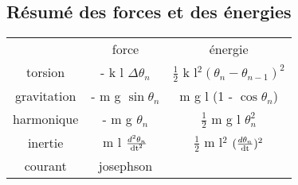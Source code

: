\subsection{Résumé des forces et des énergies}
\begin{center}
\begin{tabular}{ccc}
 & force & énergie \\
torsion & -  k l $\Delta \theta _n$ & $\frac{1}{2}$ k l$^2 (\theta _n-\theta _{n-1})^2$ \\
gravitation & - m g $\sin{\theta _n}$ & m g l (1 - $\cos{\theta _n}$) \\
harmonique & - m g $\theta _n$ & $\frac{1}{2}$ m g l $\theta _n^2$ \\
inertie & m l $\frac{d^2 \theta _n}{\operatorname{dt}^2}$ & $\frac{1}{2}$ m l$^2$ $(\frac{d \theta _n}{\operatorname{dt}})^2$ \\
courant & josephson & \\
\end{tabular}
\end{center}
%
